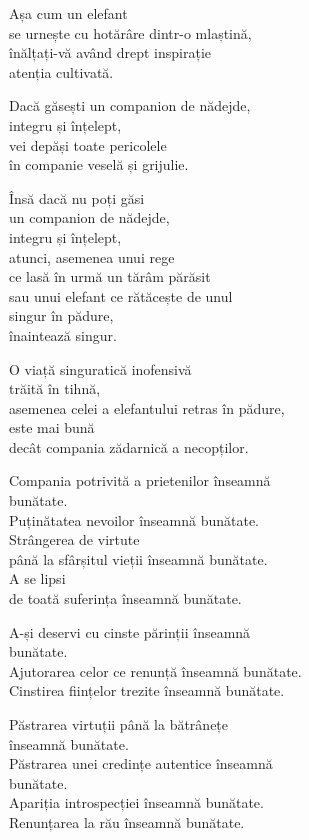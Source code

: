 Așa cum un elefant\\
se urnește cu hotărâre dintr-o mlaștină,\\
înălțați-vă având drept inspirație\\
atenția cultivată.

Dacă găsești un companion de nădejde,\\
integru și înțelept,\\
vei depăși toate pericolele\\
în companie veselă și grijulie.


Însă dacă nu poți găsi\\
un companion de nădejde,\\
integru și înțelept,\\
atunci, asemenea unui rege\\
ce lasă în urmă un tărâm părăsit\\
sau unui elefant ce rătăcește de unul\\
singur în pădure,\\
înaintează singur.


O viață singuratică inofensivă\\
trăită în tihnă,\\
asemenea celei a elefantului retras în pădure,\\
este mai bună\\
decât compania zădarnică a necopților.


Compania potrivită a prietenilor înseamnă\\
bunătate.\\
Puținătatea nevoilor înseamnă bunătate.\\
Strângerea de virtute\\
până la sfârșitul vieții înseamnă bunătate.\\
A se lipsi\\
de toată suferința înseamnă bunătate.


A-și deservi cu cinste părinții înseamnă\\
bunătate.\\
Ajutorarea celor ce renunță înseamnă bunătate.\\
Cinstirea ființelor trezite înseamnă bunătate.


Păstrarea virtuții până la bătrânețe\\
înseamnă bunătate.\\
Păstrarea unei credințe autentice înseamnă\\
bunătate.\\
Apariția introspecției înseamnă bunătate.\\
Renunțarea la rău înseamnă bunătate.
